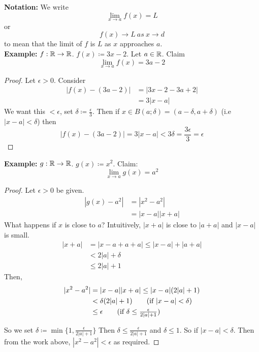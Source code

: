\documentclass[openany]{report}
\begin{document}
 \textbf{Notation:} We write 
 $$\lim_{x \rightarrow a} f(x) = L$$
 or 
 $$f(x) \rightarrow L \ as \ x \rightarrow d$$
 to mean that the limit of $f$ is $L$ as $x$ approaches $a$.\\[2ex]
 \textbf{Example:} $f: \mathbb{R} \rightarrow \mathbb{R}$. $f(x) \coloneqq 3x - 2$. 
 Let $a \in \mathbb{R}$. Claim
 $$\lim_{x\rightarrow a} f(x) = 3a - 2$$
 \begin{proof}
    Let $\epsilon > 0$. Consider 
    \begin{align*}
        |f(x) - (3a-2)| &= |3x-2 - 3a + 2|\\
        &= 3|x-a|
    \end{align*}
    We want this $< \epsilon$, set $\delta \coloneqq \frac{\epsilon}{3}$. Then if
    $x \in B(a; \delta) = (a - \delta, a + \delta)$ (i.e $|x-a| < \delta$)
    then 
    $$|f(x) - (3a - 2)| = 3|x-a| < 3 \delta = \frac{3\epsilon}{3} = \epsilon$$
 \end{proof}
\textbf{Example:} $g: \mathbb{R} \rightarrow \mathbb{R}$. $g(x) \coloneqq x^2$. Claim: 
$$\lim_{x\rightarrow a} g(x) = a^2$$
\begin{proof}
    Let $\epsilon > 0$ be given.
    \begin{align*}
        |g(x) - a^2| &= |x^2 - a^2| \\
        & = |x - a| |x + a|
    \end{align*}
    What happens if $x$ is close to $a$? Intuitively, $|x + a|$ is close to $|a+a|$
    and $|x-a|$ is small.
    \begin{align*}
        |x+a| &= |x -a + a + a| \leq |x - a| + |a + a|\\
              &< 2|a| + \delta \tag{if $|x-a|<\delta$}\\
              &\leq 2|a| + 1\tag{$\delta \leq 1$}
    \end{align*}
    Then, 
    \begin{align*}
        |x^2 - a^2| &= |x-a||x+a|\leq |x-a|(2|a| + 1)\\
                    &< \delta(2|a| + 1)\tag{if $|x-a|<\delta$}\\
                    &\leq \epsilon\tag{if $\delta \leq \frac{\epsilon}{2|a| + 1}$}
    \end{align*}
    \begin{center}
    \end{center}
    So we set $\delta \coloneqq \min \{1, \frac{\epsilon}{2|a| + 1}\}$
    Then $\delta \leq \frac{\epsilon}{2|a| + 1}$ and $\delta \leq 1$. So
    if $|x-a| < \delta$. Then from the work above, $|x^2-a^2| < \epsilon$ as required.
\end{proof}
\end{document}
